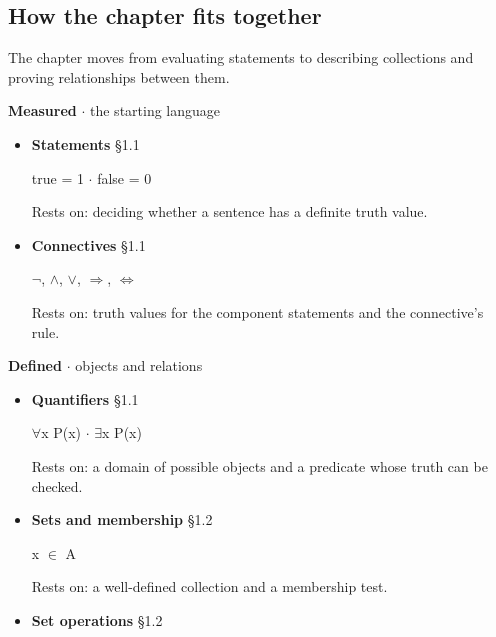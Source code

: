 \documentclass[11pt]{article}
\begin{document}
\begin{keepsection}
\section{How the chapter fits together}

The chapter moves from evaluating statements to describing collections and proving relationships between them.

\textbf{Measured} \ensuremath{\cdot} the starting language

\begin{itemize}
\item {}
\textbf{Statements} \hfill{\small\color{FAUblue}§1.1}

true = 1 \ensuremath{\cdot} false = 0

Rests on: deciding whether a sentence has a definite truth value.
\item {}
\textbf{Connectives} \hfill{\small\color{FAUblue}§1.1}

\ensuremath{\neg}, \ensuremath{\land}, \ensuremath{\lor}, \ensuremath{\Rightarrow}, \ensuremath{\Leftrightarrow}

Rests on: truth values for the component statements and the connective's rule.
\end{itemize}

\textbf{Defined} \ensuremath{\cdot} objects and relations

\begin{itemize}
\item {}
\textbf{Quantifiers} \hfill{\small\color{FAUblue}§1.1}

\ensuremath{\forall}x P(x) \ensuremath{\cdot} \ensuremath{\exists}x P(x)

Rests on: a domain of possible objects and a predicate whose truth can be checked.
\item {}
\textbf{Sets and membership} \hfill{\small\color{FAUblue}§1.2}

x \ensuremath{\in} A

Rests on: a well-defined collection and a membership test.
\item {}
\textbf{Set operations} \hfill{\small\color{FAUblue}§1.2}


\end{itemize}
\end{keepsection}
\end{document}
